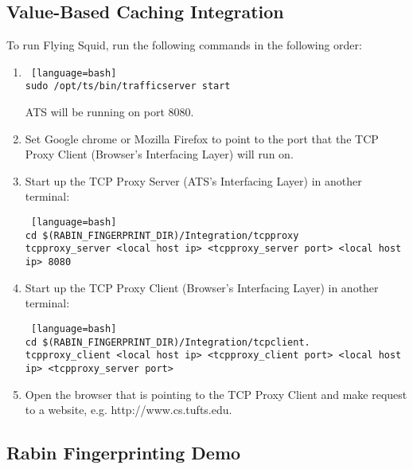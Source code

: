 \subsection{Value-Based Caching Integration}

To run Flying Squid, run the following commands in the following order:

\begin{enumerate}

\item 

\begin{lstlisting} [language=bash] 
sudo /opt/ts/bin/trafficserver start
\end{lstlisting}

ATS will be running on port 8080.

\item 

Set Google chrome or Mozilla Firefox to point to the port that the TCP Proxy Client (Browser's Interfacing Layer) will run on. 

\item 

Start up the TCP Proxy Server (ATS's Interfacing Layer) in another terminal:

\begin{lstlisting} [language=bash] 
cd $(RABIN_FINGERPRINT_DIR)/Integration/tcpproxy
tcpproxy_server <local host ip> <tcpproxy_server port> <local host ip> 8080
\end{lstlisting}

\item

Start up the TCP Proxy Client (Browser's Interfacing Layer) in another terminal:

\begin{lstlisting} [language=bash] 
cd $(RABIN_FINGERPRINT_DIR)/Integration/tcpclient.
tcpproxy_client <local host ip> <tcpproxy_client port> <local host ip> <tcpproxy_server port>
\end{lstlisting}

\item

Open the browser that is pointing to the TCP Proxy Client and make request to a website, e.g. http://www.cs.tufts.edu.

\end{enumerate}

\subsection{Rabin Fingerprinting Demo}

